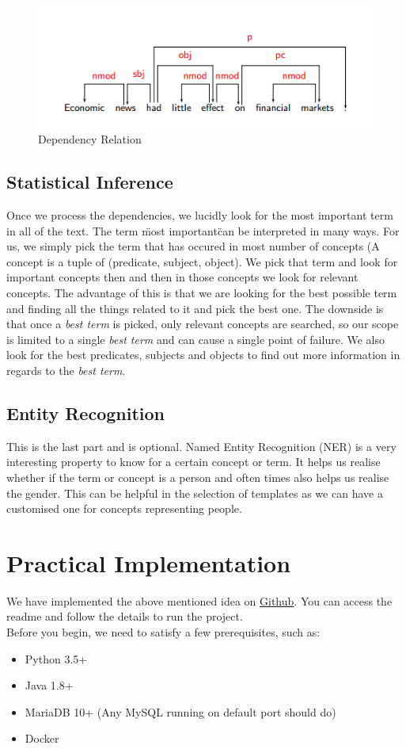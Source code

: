 \documentclass[conference]{IEEEtran}
\begin{document}
\begin{figure}[h!]
\centering
\includegraphics[scale=0.4]{image1}
\caption{Dependency Relation}
    \label{fig:image1}
\end{figure}

\subsection{Statistical Inference}
Once we process the dependencies, we lucidly look for the most important term in all of the text. The term \"most important\" can be interpreted in many ways. For us, we simply pick the term that has occured in most number of concepts (A concept is a tuple of (predicate, subject, object). We pick that term and look for important concepts then and then in those concepts we look for relevant concepts. The advantage of this is that we are looking for the best possible term and finding all the things related to it and pick the best one. The downside is that once a \textit{best term} is picked, only relevant concepts are searched, so our scope is limited to a single \textit{best term} and can cause a single point of failure. We also look for the best predicates, subjects and objects to find out more information in regards to the \textit{best term}.

\subsection{Entity Recognition}
This is the last part and is optional. Named Entity Recognition (NER) is a very interesting property to know for a certain concept or term. It helps us realise whether if the term or concept is a person and often times also helps us realise the gender. This can be helpful in the selection of templates as we can have a customised one for concepts representing people.

\section{Practical Implementation}
We have implemented the above mentioned idea on \href{https://github.com/vivekpatani/text-summarizer}{Github}. You can access the readme and follow the details to run the project.\\
Before you begin, we need to satisfy a few prerequisites, such as:
\begin{itemize}
\item Python 3.5+
\item Java 1.8+
\item MariaDB 10+ (Any MySQL running on default port should do)
\item Docker
\end{itemize}
\end{document}
